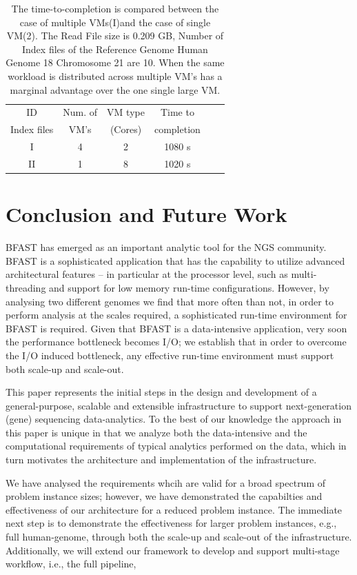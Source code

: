 \documentclass{acm_proc_article-sp}
\begin{document}
 \begin{table}
 \small
 \begin{tabular}{|c|c|c|c|c|c|} 
 \hline 
ID & Num. of & VM type  & Time to  \\ 
      Index files & VM's    & (Cores) & completion\\ 
\hline
I & 4 &  2 & 1080 s \\
II & 1 & 8 & 1020 s \\
 \hline 
 \end{tabular}
 \label{table:cloud-VM} 
 \caption{The time-to-completion is compared between the case of multiple VMs(I)and the case of single VM(2).  The Read File size is  0.209 GB, Number of Index files of the Reference Genome Human Genome 18 Chromosome 21 are 10.  When the same workload is distributed across multiple VM's has a
marginal advantage over the one single large VM.}
\end{table}



\section{Conclusion and Future Work}

BFAST has emerged as an important analytic tool for the NGS
community. BFAST is a sophisticated application that has the
capability to utilize advanced architectural features -- in particular
at the processor level, such as multi-threading and support for low
memory run-time configurations. However, by analysing two different
genomes we find that more often than not, in order to perform analysis
at the scales required, a sophisticated run-time environment for BFAST
is required. Given that BFAST is a data-intensive application, very
soon the performance bottleneck becomes I/O; we establish that in
order to overcome the I/O induced bottleneck, any effective run-time
environment must support both scale-up and scale-out. 

This paper represents the initial steps in the design and development
of a general-purpose, scalable and extensible infrastructure to
support next-generation (gene) sequencing data-analytics. To the best
of our knowledge the approach in this paper is unique in that we
analyze both the data-intensive and the computational requirements of
typical analytics performed on the data, which in turn motivates the
architecture and implementation of the infrastructure. 

We have analysed the requirements whcih are valid for a broad spectrum
of problem instance sizes; however, we have demonstrated the
capabilties and effectiveness of our architecture for a reduced
problem instance. The immediate next step is to demonstrate the
effectiveness for larger problem instances, e.g., full human-genome,
through both the scale-up and scale-out of the infrastructure.
Additionally, we will extend our framework to develop and support
multi-stage workflow, i.e., the full pipeline,
 
\end{document}
